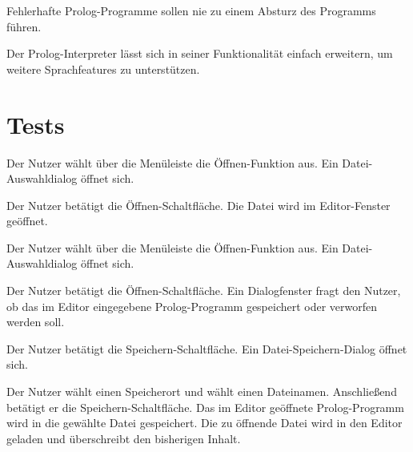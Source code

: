\documentclass[parskip=full,11pt,twoside]{scrartcl}
\begin{document}

Fehlerhafte Prolog-Programme sollen nie zu einem Absturz des Programms führen.


Der Prolog-Interpreter lässt sich in seiner Funktionalität einfach erweitern, um weitere Sprachfeatures zu unterstützen.

\section{Tests}


{Der Nutzer wählt über die Menüleiste die Öffnen-Funktion aus.}
{Ein Datei-Auswahldialog öffnet sich.}

{Der Nutzer betätigt die Öffnen-Schaltfläche.}
{Die Datei wird im Editor-Fenster geöffnet.}


{Der Nutzer wählt über die Menüleiste die Öffnen-Funktion aus.}
{Ein Datei-Auswahldialog öffnet sich.}

{Der Nutzer betätigt die Öffnen-Schaltfläche.}
{Ein Dialogfenster fragt den Nutzer, ob das im Editor eingegebene Prolog-Programm gespeichert oder verworfen werden soll.}

{Der Nutzer betätigt die Speichern-Schaltfläche.}
{Ein Datei-Speichern-Dialog öffnet sich.}

{Der Nutzer wählt einen Speicherort und wählt einen Dateinamen. Anschließend betätigt er die Speichern-Schaltfläche.}
{Das im Editor geöffnete Prolog-Programm wird in die gewählte Datei gespeichert. Die zu öffnende Datei wird in den Editor geladen und überschreibt den bisherigen Inhalt.}
\end{document}
